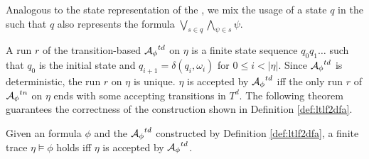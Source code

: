 Analogous to the state representation of the \TNFA, we mix the usage of a state $q$ in the \TDFA such that $q$ also represents the \ltlf formula $\bigvee_{s\in q}\bigwedge_{\psi\in s}\psi$. 

A run $r$ of the transition-based \DFA ${\mathcal{A}_{\phi}}^{td}$ on $\eta$ is a finite state sequence $q_0 q_1\ldots$ such that $q_0$ is the initial state and $q_{i+1} = \delta(q_i,\omega_i)$ for $0\leq i < |\eta|$. Since ${\mathcal{A}_{\phi}}^{td}$ is deterministic, the run $r$ on $\eta$ is unique. $\eta$ is accepted by ${\mathcal{A}_{\phi}}^{td}$ iff the only run $r$ of ${\mathcal{A}_{\phi}}^{tn}$ on $\eta$ ends with some accepting transitions in $T^d$. The following theorem guarantees the correctness of the \TDFA construction shown in Definition \ref{def:ltlf2dfa}. 

\begin{theorem}
Given an \ltlf formula $\phi$ and the \TDFA ${\mathcal{A}_{\phi}}^{td}$ constructed by Definition \ref{def:ltlf2dfa}, a finite trace $\eta\models\phi$ holds iff $\eta$ is accepted by ${\mathcal{A}_{\phi}}^{td}$. 
\end{theorem}
